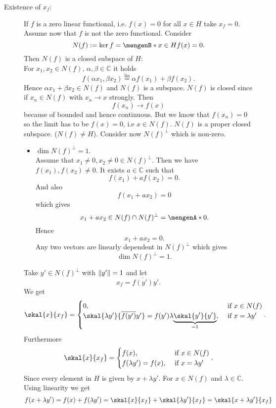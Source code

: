 \begin{beweis}
	\begin{description}
		\item[Existence of $x_f$:] If $f$ is a zero linear functional, i.e. $f(x)= 0$ for all $x \in H$ take $x_f = 0$. Assume now that $f$ is not the zero functional. Consider \[
			N(f) := \ker{f} = \set[x \in H]{f(x)= 0}.
		\] 
		Then $N(f)$ is a closed subspace of $H$: \\
		For $x_1,x_2 \in N(f), \,\alpha, \beta \in \mathbb{C}$ it holds
		\[
			f( \alpha x_1, \beta x_2) \stackrel{\text{lin}}{=} \alpha f(x_1) + \beta f(x_2).
		\]
		Hence $\alpha x_1 + \beta x_2 \in N(f)$ and $N(f)$ is a subspace. $N(f)$ is closed since if $x_n \in N(f)$ with $x_n \to x$ strongly. Then 
		\[
			f(x_n) \to f(x)
		\] 
		because of bounded and hence continuous. But we know that $f(x_n) = 0$ so the limit has to be $f(x)=0$, i.e $x \in N(f)$. $N(f)$ is a proper closed subspace. ($N(f) \neq H$). Consider now $N(f)^{\perp}$ which is non-zero. \begin{itemize}
			\item $\dim N(f)^{\perp} = 1$. \\
			Assume that $x_1 \neq 0,x_2 \neq 0 \in N(f)^{\perp}$. Then we have $f(x_1),f(x_2) \neq 0$. It exists $a \in \mathbb{C}$ such that
			\[
				f(x_1) + a f(x_2) = 0.
			\]
			And also
			\[
				f(x_1+a x_2) = 0
			\]
			which gives 
			\[
				x_1+a x_2 \in N(f) \cap N(f)^{\perp} = \set{0}.
 			\] 
			Hence
			\[
				x_1 + a x_2 = 0.
			\]
			Any two vectors are linearly dependent in $N(f)^{\perp}$ which gives \[
				\dim N(f)^{\perp} = 1.
			\]
		\end{itemize}
		Take $y' \in N(f)^{\perp}$ with $\norm{y'} = 1$ and let \[
			x_f = \overline{f(y')}y'.
		\]
		We get
		\[
			\skal{x}{x_f} = \begin{cases}
				0, &\text{ if }x \in N(f)\\
				\skal{\lambda y'}{\overline{f(y')}y'}= f(y') \lambda \underset{=1}{\underbrace{\skal{y'}{y'}}}, &\text{ if }x = \lambda y'
			\end{cases}.
		\]
		Furthermore
		\[
			\skal{x}{x_f} = \begin{cases}
				f(x), &\text{ if }x \in N(f)\\
				f(\lambda y') = f(x), &\text{ if }x = \lambda y'
			\end{cases}.
		\]
		Since every element in $H$ is given by $x + \lambda y'$. For $x \in N(f)$ and $\lambda \in \mathbb{C}$. Using linearity we get \[
			f(x + \lambda y') = f(x) + f(\lambda y') = \skal{x}{x_f} + \skal{\lambda y'}{x_f} = \skal{x+ \lambda y'}{x_f}
\]
\end{description}
\end{beweis}
